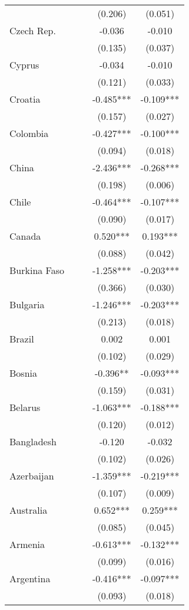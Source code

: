 \documentclass[]{article}
\begin{document}
\begin{tabular}{lcccc}
 &  &  & (0.206) & (0.051) \\
Czech Rep. &  &  & -0.036 & -0.010 \\
 &  &  & (0.135) & (0.037) \\
Cyprus &  &  & -0.034 & -0.010 \\
 &  &  & (0.121) & (0.033) \\
Croatia &  &  & -0.485*** & -0.109*** \\
 &  &  & (0.157) & (0.027) \\
Colombia &  &  & -0.427*** & -0.100*** \\
 &  &  & (0.094) & (0.018) \\
China &  &  & -2.436*** & -0.268*** \\
 &  &  & (0.198) & (0.006) \\
Chile &  &  & -0.464*** & -0.107*** \\
 &  &  & (0.090) & (0.017) \\
Canada &  &  & 0.520*** & 0.193*** \\
 &  &  & (0.088) & (0.042) \\
Burkina Faso &  &  & -1.258*** & -0.203*** \\
 &  &  & (0.366) & (0.030) \\
Bulgaria &  &  & -1.246*** & -0.203*** \\
 &  &  & (0.213) & (0.018) \\
Brazil &  &  & 0.002 & 0.001 \\
 &  &  & (0.102) & (0.029) \\
Bosnia &  &  & -0.396** & -0.093*** \\
 &  &  & (0.159) & (0.031) \\
Belarus &  &  & -1.063*** & -0.188*** \\
 &  &  & (0.120) & (0.012) \\
Bangladesh &  &  & -0.120 & -0.032 \\
 &  &  & (0.102) & (0.026) \\
Azerbaijan &  &  & -1.359*** & -0.219*** \\
 &  &  & (0.107) & (0.009) \\
Australia &  &  & 0.652*** & 0.259*** \\
 &  &  & (0.085) & (0.045) \\
Armenia &  &  & -0.613*** & -0.132*** \\
 &  &  & (0.099) & (0.016) \\
Argentina &  &  & -0.416*** & -0.097*** \\
 &  &  & (0.093) & (0.018) \\

\end{tabular}
\end{document}
